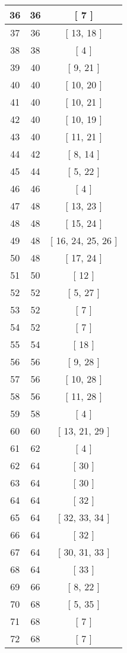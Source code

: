 \begin{center}
\begin{longtable}[H]{|| c c c ||}
36 & 36 & [ 7 ] \\ 
\hline
37 & 36 & [ 13, 18 ] \\ 
\hline
38 & 38 & [ 4 ] \\ 
\hline
39 & 40 & [ 9, 21 ] \\ 
\hline
40 & 40 & [ 10, 20 ] \\ 
\hline
41 & 40 & [ 10, 21 ] \\ 
\hline
42 & 40 & [ 10, 19 ] \\ 
\hline
43 & 40 & [ 11, 21 ] \\ 
\hline
44 & 42 & [ 8, 14 ] \\ 
\hline
45 & 44 & [ 5, 22 ] \\ 
\hline
46 & 46 & [ 4 ] \\ 
\hline
47 & 48 & [ 13, 23 ] \\ 
\hline
48 & 48 & [ 15, 24 ] \\ 
\hline
49 & 48 & [ 16, 24, 25, 26 ] \\ 
\hline
50 & 48 & [ 17, 24 ] \\ 
\hline
51 & 50 & [ 12 ] \\ 
\hline
52 & 52 & [ 5, 27 ] \\ 
\hline
53 & 52 & [ 7 ] \\ 
\hline
54 & 52 & [ 7 ] \\ 
\hline
55 & 54 & [ 18 ] \\ 
\hline
56 & 56 & [ 9, 28 ] \\ 
\hline
57 & 56 & [ 10, 28 ] \\ 
\hline
58 & 56 & [ 11, 28 ] \\ 
\hline
59 & 58 & [ 4 ] \\ 
\hline
60 & 60 & [ 13, 21, 29 ] \\ 
\hline
61 & 62 & [ 4 ] \\ 
\hline
62 & 64 & [ 30 ] \\ 
\hline
63 & 64 & [ 30 ] \\ 
\hline
64 & 64 & [ 32 ] \\ 
\hline
65 & 64 & [ 32, 33, 34 ] \\ 
\hline
66 & 64 & [ 32 ] \\ 
\hline
67 & 64 & [ 30, 31, 33 ] \\ 
\hline
68 & 64 & [ 33 ] \\ 
\hline
69 & 66 & [ 8, 22 ] \\ 
\hline
70 & 68 & [ 5, 35 ] \\ 
\hline
71 & 68 & [ 7 ] \\ 
\hline
72 & 68 & [ 7 ] \\ 
\hline

\end{longtable}
\end{center}

